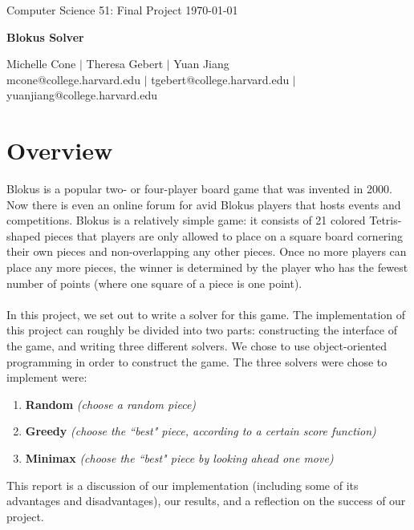 \documentclass[11pt]{article}
\begin{document}
\doublespacing

\noindent Computer Science 51: Final Project \hfill \today\\
\noindent\makebox[\linewidth]{\rule{6.5in}{2.0pt}}

\begin{center}

\smallskip
{{\LARGE \bf Blokus Solver}}
\smallskip

\noindent\makebox[\linewidth]{\rule{6.5in}{2.0pt}}

\bigskip

{\large Michelle Cone $|$ Theresa Gebert $|$ Yuan Jiang \\
\normalsize mcone@college.harvard.edu $|$ tgebert@college.harvard.edu $|$ yuanjiang@college.harvard.edu} \\

\end{center}


\bigskip


\section{Overview}

Blokus is a popular two- or four-player board game that was invented in 2000. Now there is even an online forum for avid Blokus players that hosts events and competitions. Blokus is a relatively simple game: it consists of 21 colored Tetris-shaped pieces that players are only allowed to place on a square board cornering their own pieces and non-overlapping any other pieces. Once no more players can place any more pieces, the winner is determined by the player who has the fewest number of points (where one square of a piece is one point).
\\\\
In this project, we set out to write a solver for this game. The implementation of this project can roughly be divided into two parts: constructing the interface of the game, and writing three different solvers. We chose to use object-oriented programming in order to construct the game. The three solvers were chose to implement were:
\begin{enumerate}
	\item {\bf Random} {\it (choose a random piece)}
	\item {\bf Greedy} {\it (choose the ``best" piece, according to a certain score function)}
	\item {\bf Minimax} {\it (choose the ``best" piece by looking ahead one move)}
\end{enumerate}
This report is a discussion of our implementation (including some of its advantages and disadvantages), our results, and a reflection on the success of our project.
\end{document}
